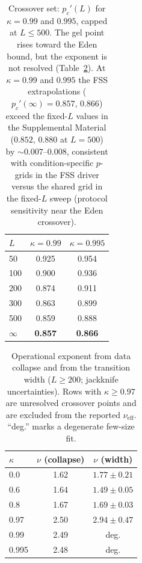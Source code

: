 \documentclass[aps,prl,twocolumn,superscriptaddress,floatfix,nofootinbib,longbibliography]{revtex4-2}
\newcommand{\pcp}{p_c'}
\newcommand{\kap}{\kappa}
\newcommand{\nueff}{\nu_{\mathrm{eff}}}
\begin{document}
\begin{table}[h]
\centering
\caption{Crossover set: $\pcp(L)$ for $\kap=0.99$ and $0.995$, capped at
$L\le500$. The gel point rises toward the Eden bound, but the exponent is not
resolved (Table~\ref{tab:nu}). At $\kap=0.99$ and $0.995$ the FSS extrapolations
($\pcp(\infty)=0.857$, $0.866$) exceed the fixed-$L$ values in the Supplemental
Material ($0.852$, $0.880$ at $L=500$) by $\sim0.007$--$0.008$, consistent with
condition-specific $p$-grids in the FSS driver versus the shared grid in the
fixed-$L$ sweep (protocol sensitivity near the Eden crossover).}
\label{tab:pcLcross}
\begin{tabular}{lcc}
\toprule
$L$ & $\kap=0.99$ & $\kap=0.995$ \\
\midrule
50   & 0.925 & 0.954 \\
100  & 0.900 & 0.936 \\
200  & 0.874 & 0.911 \\
300  & 0.863 & 0.899 \\
500  & 0.859 & 0.888 \\
\midrule
$\infty$ & \textbf{0.857} & \textbf{0.866} \\
\bottomrule
\end{tabular}
\end{table}

\begin{table}[h]
\centering
\caption{Operational exponent from data collapse and from the transition width
($L\ge200$; jackknife uncertainties). Rows with $\kap\ge0.97$ are unresolved
crossover points and are excluded from the reported $\nueff$. ``deg.'' marks a
degenerate few-size fit.}
\label{tab:nu}
\begin{tabular}{lcc}
\toprule
$\kap$ & $\nu$ (collapse) & $\nu$ (width) \\
\midrule
0.0  & 1.62 & $1.77\pm0.21$ \\
0.6  & 1.64 & $1.49\pm0.05$ \\
0.8  & 1.67 & $1.69\pm0.03$ \\
0.97  & 2.50 & $2.94\pm0.47$ \\
0.99  & 2.49 & deg. \\
0.995 & 2.48 & deg. \\
\bottomrule
\end{tabular}
\end{table}
\end{document}
